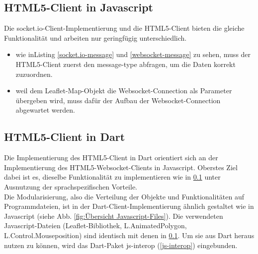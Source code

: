 \subsection{HTML5-Client in Javascript}\label{HTML5-Client in Javascript}
Die socket.io-Client-Implementierung und die HTML5-Client bieten die gleiche Funktionalität und arbeiten nur geringfügig unterschiedlich.
 \begin{itemize}
 \item wie inListing \ref{socket.io-message} und \ref{websocket-message} zu sehen, muss der HTML5-Client zuerst den message-type abfragen, um die Daten korrekt zuzuordnen.
 \item weil dem Leaflet-Map-Objekt die Websocket-Connection als Parameter übergeben wird, muss dafür der Aufbau der Websocket-Connection abgewartet werden. 
\end{itemize}

\subsection{HTML5-Client in Dart}\label{HTML5-Client in Dart}
Die Implementierung des HTML5-Client in Dart orientiert sich an der Implementierung des HTML5-Websocket-Clients in Javascript. Oberstes Ziel dabei ist es, dieselbe Funktionalität zu implementieren wie in \ref{HTML5-Client in Javascript} unter Ausnutzung der sprachspezifischen Vorteile. \\

Die Modularisierung, also die Verteilung der Objekte und Funktionalitäten auf Programmdateien, ist in der Dart-Client-Implementierung ähnlich gestaltet wie in Javascript (siehe Abb. \ref{fig:Übersicht Javascript-Files}). Die verwendeten Javascript-Dateien (Leaflet-Bibliothek, L.AnimatedPolygon, L.Control.Mouseposition) sind identisch mit denen in \ref{HTML5-Client in Javascript}. Um sie aus Dart heraus nutzen zu können, wird das Dart-Paket js-interop (\ref{js-interop}) eingebunden.

